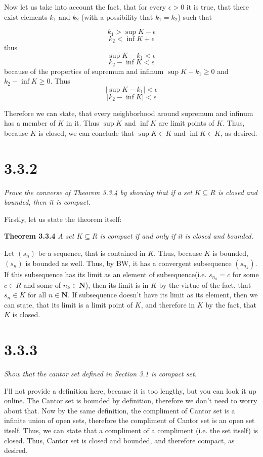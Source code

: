 \documentclass[11pt,oneside,titlepage]{book}
\begin{document}
Now let us take into account the fact, that for every $\epsilon > 0$ it is
true, that there exist elements $k_1$ and $k_2$ (with a possibility
that $k_1 = k_2$) such that

$$k_1 > \sup K - \epsilon$$
$$k_2 < \inf K + \epsilon$$
thus
$$\sup K - k_1 <  \epsilon$$
$$k_2 - \inf K < \epsilon$$
because of the properties of supremum and infinum $\sup K - k_1 \geq  0$ and
$k_2 - \inf K \geq 0$. Thus
$$|\sup K - k_1| < \epsilon$$
$$|k_2 - \inf K| < \epsilon$$

Therefore we can state, that every neighborhood around supremum and infinum
has a member of $K$ in it. Thus $\sup K$ and $\inf  K$ are limit points of $K$.
Thus, because $K$ is closed, we can conclude that $\sup K \in K$ and
$\inf K \in K$, as desired.

\section*{3.3.2}
\textit{Prove the converse of Theorem 3.3.4 by showing that if a set
  $K \subseteq R$ is closed and bounded, then it is compact.}

Firstly, let us state the theorem itself:

\textbf{Theorem 3.3.4}
\textit{A set $K \subseteq R$ is compact if and only if it is closed and
  bounded.}

Let $(s_n)$ be a sequence, that is contained in $K$. Thus, because $K$ is
bounded, $(s_n)$ is bounded as well. Thus, by BW, it has a convergent
subsequence $(s_{n_k})$. If this subsequence has its limit as an
element of subsequence(i.e. $s_{n_k} = c$
for some $c \in R$ and some of $n_k \in  \textbf{N}$),
then its limit is in $K$ by the virtue of the fact, that $s_n \in K$ for
all $n \in \textbf{N}$.
If subsequence doesn't have its limit as its element, then we can state,
that its limit is a limit point of $K$, and therefore in $K$ by the fact, that
$K$ is closed.

\section*{3.3.3}
\textit{Show that the cantor set defined in Section 3.1 is compact set. }

I'll not provide a definition here, because it is too lengthy, but you can
look it up online. The Cantor set is bounded by definition, therefore we don't
need to worry about that. Now by the same definition, 
the compliment of Cantor set is a infinite union of open sets, therefore
the compliment of Cantor set is an open set itself. Thus, we can state
that a compliment of a compliment (i.e. the set itself) is closed. Thus,
Cantor set is closed and bounded, and therefore compact, as desired.
\end{document}
